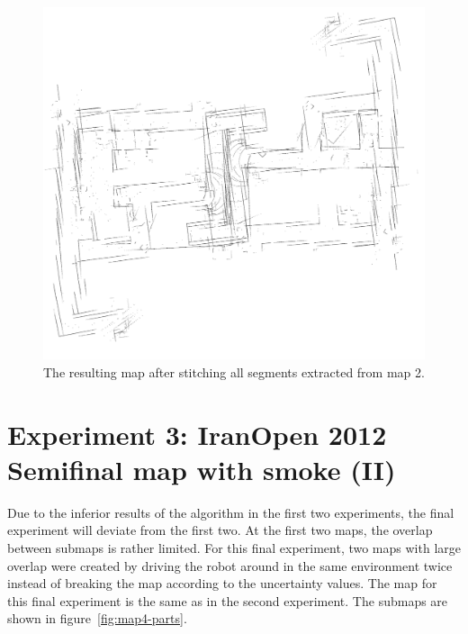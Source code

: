 \begin{figure}[ht]
\centering
  \includegraphics[width=\textwidth]{images/experiment/map3/result/step2.png}
  \caption{The resulting map after stitching all segments extracted from map 2.}
  \label{fig:map3-result}
\end{figure}

\section{Experiment 3: IranOpen 2012 Semifinal map with smoke (II)}

Due to the inferior results of the algorithm in the first two experiments, the final experiment will deviate from the first two. At the first two maps, the overlap between submaps is rather limited. For this final experiment, two maps with large overlap were created by driving the robot around in the same environment twice instead of breaking the map according to the uncertainty values. The map for this final experiment is the same as in the second experiment. The submaps are shown in figure~\ref{fig:map4-parts}. 

